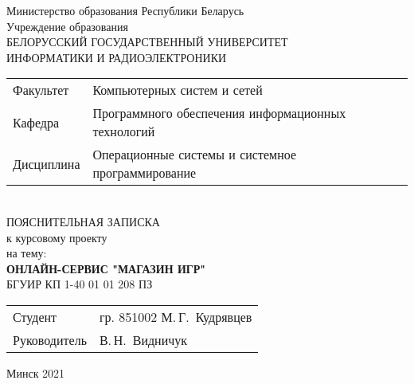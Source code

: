 \begin{titlepage}
  \begin{center}
    Министерство образования Республики Беларусь\\[1em]
    Учреждение образования\\
    БЕЛОРУССКИЙ ГОСУДАРСТВЕННЫЙ УНИВЕРСИТЕТ \\
    ИНФОРМАТИКИ И РАДИОЭЛЕКТРОНИКИ\\[1em]

    \begin{minipage}{\textwidth}
      \begin{flushleft}
        \begin{tabular}{ l l }
          Факультет  & Компьютерных систем и сетей\\
          Кафедра    & Программного обеспечения информационных технологий\\
          Дисциплина & Операционные системы и системное программирование
        \end{tabular}
      \end{flushleft}
    \end{minipage}\\[6em]

    {ПОЯСНИТЕЛЬНАЯ ЗАПИСКА}\\
    {к курсовому проекту}\\
    {на тему:}\\[1em]
    \textbf{\large ОНЛАЙН-СЕРВИС "МАГАЗИН ИГР"}\\[1em]


    {БГУИР КП 1-40 01 01 208 ПЗ}\\[17em]
    
    \begin{tabular}{ p{}p{} }
      Студент & гр. 851002 М.\,Г.~Кудрявцев \\
      Руководитель & В.\,Н.~Видничук \\
    \end{tabular}
    
    \vfill
    {\normalsize Минск 2021}
  \end{center}
\end{titlepage}
